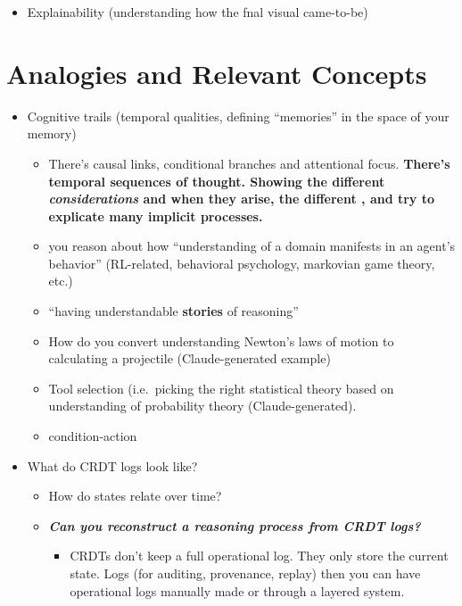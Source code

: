 \documentclass[
]{article}
\providecommand{\tightlist}{%
  \setlength{\itemsep}{0pt}\setlength{\parskip}{0pt}}\usepackage{longtable,booktabs,array}
\begin{document}
\begin{itemize}
\tightlist
\item
  Explainability (understanding how the fnal visual came-to-be)
\end{itemize}

\section{Analogies and Relevant
Concepts}\label{analogies-and-relevant-concepts}

\begin{itemize}
\item
  Cognitive trails (temporal qualities, defining ``memories'' in the
  space of your memory)

  \begin{itemize}
  \item
    There's causal links, conditional branches and attentional focus.
    \textbf{There's temporal sequences of thought. Showing the different
    \emph{considerations} and when they arise, the different , and try
    to explicate many implicit processes.}
  \item
    you reason about how ``understanding of a domain manifests in an
    agent's behavior'' (RL-related, behavioral psychology, markovian
    game theory, etc.)
  \item
    ``having understandable \textbf{stories} of reasoning''
  \end{itemize}

  \begin{itemize}
  \item
    How do you convert understanding Newton's laws of motion to
    calculating a projectile (Claude-generated example)
  \item
    Tool selection (i.e.~picking the right statistical theory based on
    understanding of probability theory (Claude-generated).
  \item
    condition-action
  \end{itemize}
\item
  What do CRDT logs look like?

  \begin{itemize}
  \item
    How do states relate over time?
  \item
    \textbf{\emph{Can you reconstruct a reasoning process from CRDT
    logs?}}

    \begin{itemize}
    \item
      CRDTs don't keep a full operational log. They only store the
      current state. Logs (for auditing, provenance, replay) then you
      can have operational logs manually made or through a layered
      system.


\end{itemize}
\end{itemize}
\end{itemize}
\end{document}
